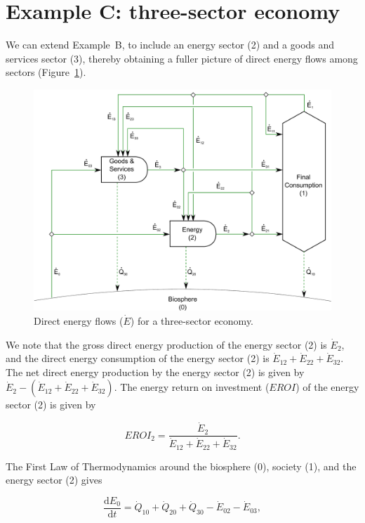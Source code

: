 \section{Example C: three-sector economy} %
\label{sec:C_energy}

We can extend Example~B, to include an energy sector (2) 
and a goods and services sector (3), thereby obtaining
a fuller picture of direct energy flows among sectors
(Figure~\ref{fig:C_energy}).

\begin{figure}[!ht]
\centering
\includegraphics[width=0.8\linewidth]{Part_1/Chapter_Energy/images/3_sector_direct_energy.pdf}
\caption[Direct energy flows for a three-sector economy]{Direct energy flows ($\dot{E}$) for a three-sector economy.}
\label{fig:C_energy}
\end{figure}

We note that the gross direct energy production of the energy sector (2) is 
$\dot{E}_{2}$, and the direct energy consumption of the energy sector (2) is 
$\dot{E}_{12} + \dot{E}_{22} + \dot{E}_{32}$. 
The net direct energy production by the energy sector (2)
is given by $\dot{E}_{2} - (\dot{E}_{12} + \dot{E}_{22} + \dot{E}_{32})$.
The energy return on investment 
($EROI$) of the energy sector (2) is given by

\begin{equation} \label{eq:C-EROI}
	EROI_2 
	= \frac{\dot{E}_{2}}{\dot{E}_{12} + \dot{E}_{22} + \dot{E}_{32}}.
\end{equation}

The First Law of Thermodynamics around the 
biosphere (0), society (1), and the energy sector (2) gives

\begin{equation} \label{eq:C-CV_E_dot_0}
	\frac{\mathrm{d}E_{0}}{\mathrm{d}t} 	 
	= \dot{Q}_{10} 
	+ \dot{Q}_{20} 
	+ \dot{Q}_{30} 
	- \dot{E}_{02} 
	- \dot{E}_{03},
\end{equation}

